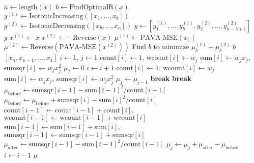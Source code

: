 \documentclass[10pt]{article}
\begin{document}
\begin{algorithm}
\caption{}
\begin{algorithmic}
	\State {}
	\State $n \gets \text{length}(x)$
	\State $b \gets \text{FindOptimalB}(x)$
	\State $y^{(1)} \gets \text{IsotonicIncreasing}([x_1,\dots,x_b])$
	\State $y^{(2)} \gets \text{IsotonicDecreasing}([x_b,\dots,x_n])$
	\State $y \gets [y^{(1)}_1,\dots,y^{(1)}_b,y^{(2)}_2,\dots,y^{(2)}_{n-b+1}]$
	\State \Return $y$
\EndFunction
\Statex
{}
	\Statex {}
	\State $x^{(1)} \gets x$
	\State $x^{(2)} \gets -\text{Reverse}(x)$
	\State $\mu^{(1)} \gets \text{PAVA-MSE}(x_1)$	
	\State $\mu^{(2)} \gets \text{Reverse}(\text{PAVA-MSE}(x^{(2)}))$
	\State Find $b$ to minimize $\mu^{(1)}_b+\mu^{(2)}_b$
	\State \Return $b$
\EndFunction
\Statex
{}
	\State {}
	\State \Return $[x_n,x_{n-1},\dots,x_1]$
\EndFunction
\Statex
{}          %
	\State {}
	\State $i \gets 1$, $j \gets 1$
	\State $\text{count}[i] \gets 1$, $\text{wcount}[i] \gets w_j$
	\State $\text{sum}[i] \gets w_j x_j$, $\text{sumsqr}[i] \gets w_j x_j^2$
	\State $\mu_j \gets 0$
	\State
		\State $i \gets i+1$
		\State $\text{count}[i] \gets 1$, $\text{wcount}[i] \gets w_j$
		\State $\text{sum}[i] \gets w_j x_j$, $\text{sumsqr}[i] \gets w_j x_j^2$
		\State $\mu_j \gets \mu_{j-1}$
		\Loop
				\textbf{ break} 
			\EndIf
				\textbf{ break} 
			\Else {}
				\State $\mu_{\text{before}}\gets\text{sumsqr}[i-1]-\text{sum}[i-1]^2/\text{count}[i-1]$
				\State $\mu_{\text{before}}\gets \mu_{\text{before}}+\text{sumsqr}[i]-\text{sum}[i]^2/\text{count}[i]$
				\State $\text{count}[i-1] \gets \text{count}[i-1]+\text{count}[i]$, $\text{wcount}[i-1] \gets \text{wcount}[i-1]+\text{wcount}[i]$
				\State $\text{sum}[i-1] \gets \text{sum}[i-1]+\text{sum}[i]$, $\text{sumsqr}[i-1] \gets \text{sumsqr}[i-1]+\text{sumsqr}[i]$
				\State $\mu_{\text{after}}\gets\text{sumsqr}[i-1]-\text{sum}[i-1]^2/\text{count}[i-1]$
				\State $\mu_j\gets \mu_j+\mu_{\text{after}}-\mu_{\text{before}}$
				\State $i\gets i-1$
			\EndIf
		\EndLoop
	\EndFor
	\State \Return $\mu$
\EndFunction

\end{algorithmic}
\label{alg:PAVA2}
\end{algorithm}
\end{document}
